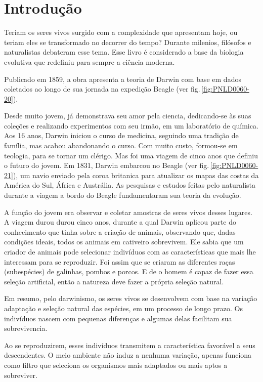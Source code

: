 \documentclass[12pt]{extarticle}
\begin{document}
\tableofcontents

\section{Introdução}

Teriam os seres vivos surgido com a complexidade que apresentam hoje, ou teriam
eles se transformado no decorrer do tempo?
Durante milenios, filósofos e naturalistas debateram esse tema.
Esse livro é considerado a base da biologia evolutiva que redefiniu para sempre
a ciência moderna.

Publicado em 1859, a obra apresenta a teoria de Darwin com base em dados coletados ao longo de sua jornada na expedição Beagle (ver fig.\,\ref{fig:PNLD0060-20}).

Desde muito jovem, já demonstrava seu amor pela ciencia, dedicando-se às suas
coleções e realizando experimentos  com seu irmão,  em um laboratório de
química. Aos 16 anos, Darwin iniciou o curso de medicina,  seguindo uma tradição de família, mas acabou abandonando o curso.
Com muito custo, formou-se em teologia, para se tornar um clérigo.  Mas foi uma
viagem de cinco anos que definiu o futuro do jovem.  Em 1831, Darwin embarcou
no Beagle (ver fig.\,\ref{fig:PNLD0060-21}), um navio enviado pela coroa britanica para atualizar os mapas das costas da América do Sul,  África e Austrália.
As pesquisas e estudos feitas pelo naturalista durante a viagem a bordo do
Beagle fundamentaram sua teoria da evolução.


A função do jovem era observar e coletar amostras de seres vivos desses
lugares. A viagem durou 
durou cinco anos, durante a qual Darwin aplicou parte do conhecimento que tinha sobre a criação de animais, observando que, dadas condições ideais, todos os animais em cativeiro
sobrevivem. Ele sabia que um criador de animais pode selecionar indivíduos com as características que mais lhe interessam para se reproduzir.
Foi assim que se criaram as diferentes raças (subespécies) de galinhas, pombos
e porcos. E de o homem é capaz de fazer essa seleção artificial, então a natureza deve fazer a própria seleção natural.

Em resumo, pelo darwinismo, os seres vivos se desenvolvem com base na variação
adaptação e seleção natural das espécies, em um processo de longo prazo.
Os indivíduos nascem com pequenas diferenças e algumas delas facilitam sua
sobrevivencia.

Ao se reproduzirem, esses indivíduos transmitem a característica favorável
a seus descendentes. O meio ambiente não induz a nenhuma variação, apenas funciona como filtro que
seleciona os organismos mais adaptados ou mais aptos a sobreviver.
\end{document}
